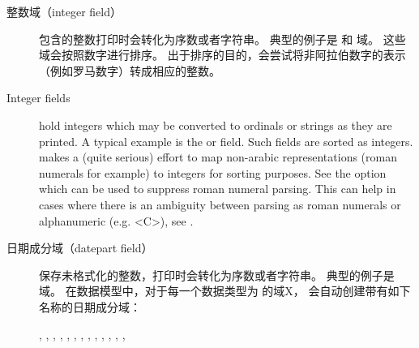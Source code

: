 \begin{description}
\begin{description}

\item[整数域（integer field）] 包含的整数打印时会转化为序数或者字符串。
典型的例子是  和  域。
这些域会按照数字进行排序。
出于排序的目的，\biber 会尝试将非阿拉伯数字的表示（例如罗马数字）转成相应的整数。

\item[Integer fields] hold integers which may be converted to ordinals or strings as they are printed. A typical example is the  or  field. Such fields are sorted as integers. \biber makes a (quite serious) effort to map non-arabic representations (roman numerals for example) to integers for sorting purposes. See the  option which can be used to suppress roman numeral parsing. This can help in cases where there is an ambiguity between parsing as roman numerals or alphanumeric (e.g. <C>), see .


\item[日期成分域（datepart field）] 保存未格式化的整数，打印时会转化为序数或者字符串。
典型的例子是  域。
在数据模型中，对于每一个数据类型为  的域X，
会自动创建带有如下名称的日期成分域：
\begin{flushleft}
, , , , , , , , , , , , , 
\end{flushleft}


\end{description}
\end{description}

